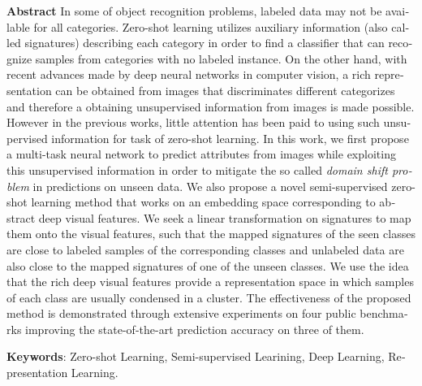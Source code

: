 


\pagestyle{empty}
\begin{latin}
  \textbf{Abstract}
In some of object recognition problems, labeled data may not be available for all categories.
 Zero-shot learning utilizes auxiliary information (also called signatures)
 describing each category in order to find a classifier that can recognize samples
from categories with no labeled instance. %
On the other hand, with recent advances made by deep neural networks in computer vision, a rich representation can be obtained from images
that discriminates different categorizes and therefore a obtaining unsupervised information from images is made possible.
However in the previous works, little attention has been paid to using such unsupervised information for task of zero-shot learning.
In this work, we first propose a multi-task neural network to predict attributes from images while exploiting this unsupervised information
in order to mitigate the so called \textit{domain shift problem} in predictions on unseen data.
We also propose a novel semi-supervised zero-shot learning method that works on an embedding space corresponding to
abstract deep visual features. We seek a linear transformation on signatures to map them onto the visual features,
such that the mapped signatures of the seen classes are close to labeled samples of the corresponding
classes and unlabeled data are also close to the mapped signatures of one of the unseen classes.
 We use the idea that the rich deep visual features provide a representation
 space in which samples of each class are usually condensed in a cluster. The effectiveness of the proposed method is demonstrated through extensive
experiments on four public benchmarks improving the state-of-the-art prediction accuracy on three of them.

\bigskip\noindent\textbf{Keywords}:
Zero-shot Learning, Semi-supervised Learining, Deep Learning, Representation Learning.
\end{latin}

\newpage
